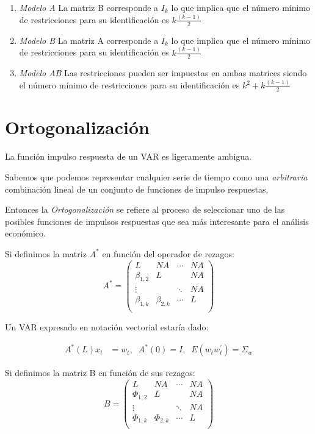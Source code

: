 \documentclass[
]{book}
\begin{document}
\begin{enumerate}
\def\labelenumi{\arabic{enumi}.}
\item
  \emph{Modelo A} La matriz B corresponde a \(I_{k}\) lo que implica que el número mínimo de restricciones para su identificación es \(k\frac{(k-1)}{2}\)
\item
  \emph{Modelo B} La matriz A corresponde a \(I_{k}\) lo que implica que el número mínimo de restricciones para su identificación es \(k\frac{(k-1)}{2}\)
\item
  \emph{Modelo AB} Las restricciones pueden ser impuestas en ambas matrices siendo el número mínimo de restricciones para su identificación es \(k^{2}+k\frac{(k-1)}{2}\)
\end{enumerate}

\hypertarget{ortogonalizaciuxf3n}{%
\section{Ortogonalización}\label{ortogonalizaciuxf3n}}

La función impulso respuesta de un VAR es ligeramente ambigua.

Sabemos que podemos representar cualquier serie de tiempo como una \emph{arbitraria} combinación lineal de un conjunto de funciones de impulso respuestas.

Entonces la \emph{Ortogonalización} se refiere al proceso de seleccionar uno de las posibles funciones de impulsos respuestas que sea más interesante para el análisis económico.

Si definimos la matriz \(A^{*}\) en función del operador de rezagos:
\begin{equation}
A^{*}=\left( \begin{array}{cccc}
L      & NA  & \cdots & NA\\
\beta_{1,2} & L   &        & NA\\
\vdots &     & \ddots & NA\\
\beta_{1,k} & \beta_{2,k}   & \cdots & L\\
\end{array}
\right)
\end{equation}

Un VAR expresado en notación vectorial estaría dado:

\begin{align}
A^{*}(L)x_{t}&=w_{t},\;\;A^{*}(0)=I,\;\;E(w_{t}w_{t}^{'})=\Sigma_w 
\end{align}

Si definimos la matriz B en función de sus rezagos:
\begin{equation}
B=\left( \begin{array}{cccc}
L      & NA  & \cdots & NA\\
\Phi_{1,2} & L   &        & NA\\
\vdots &     & \ddots & NA\\
\Phi_{1,k} & \Phi_{2,k}   & \cdots & L\\
\end{array}
\right)
\end{equation}
\end{document}
